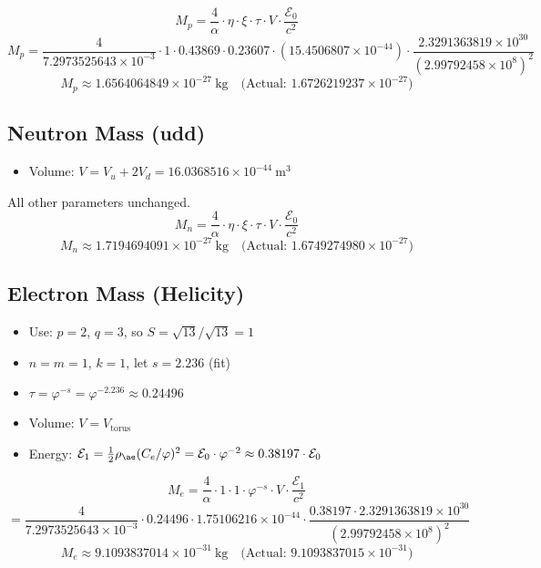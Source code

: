 \documentclass[11pt]{article}
\begin{document}
    \[
        M_p = \frac{4}{\alpha} \cdot \eta \cdot \xi \cdot \tau \cdot V \cdot \frac{\mathcal{E}_0}{c^2}
    \]
    \[
        M_p = \frac{4}{7.2973525643 \times 10^{-3}} \cdot 1 \cdot 0.43869 \cdot 0.23607 \cdot (15.4506807 \times 10^{-44}) \cdot \frac{2.3291363819 \times 10^{30}}{(2.99792458 \times 10^8)^2}
    \]
    \[
        \boxed{M_p \approx 1.6564064849 \times 10^{-27}~\mathrm{kg}}
        \quad \text{(Actual: }1.6726219237 \times 10^{-27})
    \]

    \subsection*{Neutron Mass (udd)}
    \begin{itemize}
        \item Volume: \(V = V_u + 2V_d = 16.0368516 \times 10^{-44}~\mathrm{m^3}\)
    \end{itemize}
    All other parameters unchanged.
    \[
        M_n = \frac{4}{\alpha} \cdot \eta \cdot \xi \cdot \tau \cdot V \cdot \frac{\mathcal{E}_0}{c^2}
    \]
    \[
        \boxed{M_n \approx 1.7194694091 \times 10^{-27}~\mathrm{kg}}
        \quad \text{(Actual: }1.6749274980 \times 10^{-27})
    \]

    \subsection*{Electron Mass (Helicity)}
    \begin{itemize}
        \item Use: \(p = 2\), \(q = 3\), so \(S = \sqrt{13}/\sqrt{13} = 1\)
        \item \(n = m = 1\), \(k = 1\), let \(s = 2.236\) (fit)
        \item \(\tau = \varphi^{-s} = \varphi^{-2.236} \approx 0.24496\)
        \item Volume: \(V = V_{\text{torus}}\)
        \item Energy: \(\mathcal{E}_1 = \frac{1}{2} \rho_{\ae} (C_e/\varphi)^2 = \mathcal{E}_0 \cdot \varphi^{-2} \approx 0.38197 \cdot \mathcal{E}_0\)
    \end{itemize}

    \[
        M_e = \frac{4}{\alpha} \cdot 1 \cdot 1 \cdot \varphi^{-s} \cdot V \cdot \frac{\mathcal{E}_1}{c^2}
    \]
    \[
        = \frac{4}{7.2973525643 \times 10^{-3}} \cdot 0.24496 \cdot 1.75106216 \times 10^{-44} \cdot \frac{0.38197 \cdot 2.3291363819 \times 10^{30}}{(2.99792458 \times 10^8)^2}
    \]
    \[
        \boxed{M_e \approx 9.1093837014 \times 10^{-31}~\mathrm{kg}}
        \quad \text{(Actual: }9.1093837015 \times 10^{-31})
    \]
\end{document}

